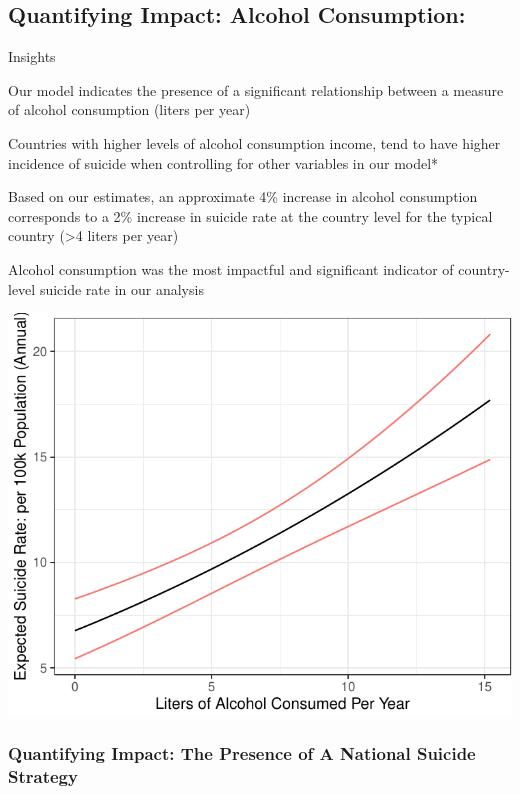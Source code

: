\documentclass[]{article}
\begin{document}
\subsection{Quantifying Impact: Alcohol
Consumption:}\label{quantifying-impact-alcohol-consumption}

Insights

Our model indicates the presence of a significant relationship between a
measure of alcohol consumption (liters per year)

Countries with higher levels of alcohol consumption income, tend to have
higher incidence of suicide when controlling for other variables in our
model*

Based on our estimates, an approximate 4\% increase in alcohol
consumption corresponds to a 2\% increase in suicide rate at the country
level for the typical country (\textgreater{}4 liters per year)

Alcohol consumption was the most impactful and significant indicator of
country-level suicide rate in our analysis

\begin{center}\includegraphics{Project_Report_files/figure-latex/a_alc_plot-1} \end{center}

\subsubsection{Quantifying Impact: The Presence of A National Suicide
Strategy}\label{quantifying-impact-the-presence-of-a-national-suicide-strategy}
\end{document}
